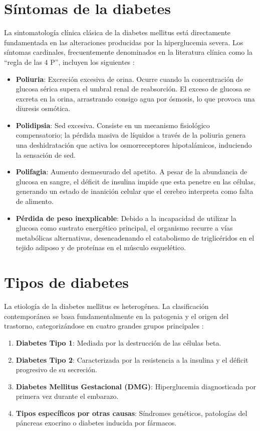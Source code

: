 \section{Síntomas de la diabetes}
La sintomatología clínica clásica de la diabetes mellitus está directamente fundamentada en las alteraciones producidas por la hiperglucemia severa. Los síntomas cardinales, frecuentemente denominados en la literatura clínica como la ``regla de las 4 P'', incluyen los siguientes \cite{who_diabetes, nutriwhite_4p}:

\begin{itemize}
    \item \textbf{Poliuria}: Excreción excesiva de orina. Ocurre cuando la concentración de glucosa sérica supera el umbral renal de reabsorción. El exceso de glucosa se excreta en la orina, arrastrando consigo agua por ósmosis, lo que provoca una diuresis osmótica.
    \item \textbf{Polidipsia}: Sed excesiva. Consiste en un mecanismo fisiológico compensatorio; la pérdida masiva de líquidos a través de la poliuria genera una deshidratación que activa los osmorreceptores hipotalámicos, induciendo la sensación de sed.
    \item \textbf{Polifagia}: Aumento desmesurado del apetito. A pesar de la abundancia de glucosa en sangre, el déficit de insulina impide que esta penetre en las células, generando un estado de inanición celular que el cerebro interpreta como falta de alimento.
    \item \textbf{Pérdida de peso inexplicable}: Debido a la incapacidad de utilizar la glucosa como sustrato energético principal, el organismo recurre a vías metabólicas alternativas, desencadenando el catabolismo de triglicéridos en el tejido adiposo y de proteínas en el músculo esquelético.
\end{itemize}

\section{Tipos de diabetes}
La etiología de la diabetes mellitus es heterogénea. La clasificación contemporánea se basa fundamentalmente en la patogenia y el origen del trastorno, categorizándose en cuatro grandes grupos principales \cite{who_diabetes}:

\begin{enumerate}
    \item \textbf{Diabetes Tipo 1}: Mediada por la destrucción de las células beta.
    \item \textbf{Diabetes Tipo 2}: Caracterizada por la resistencia a la insulina y el déficit progresivo de su secreción.
    \item \textbf{Diabetes Mellitus Gestacional (DMG)}: Hiperglucemia diagnosticada por primera vez durante el embarazo.
    \item \textbf{Tipos específicos por otras causas}: Síndromes genéticos, patologías del páncreas exocrino o diabetes inducida por fármacos.
\end{enumerate}

